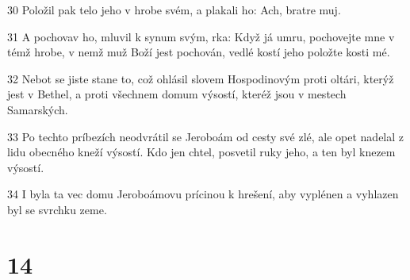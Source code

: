 \par 30 Položil pak telo jeho v hrobe svém, a plakali ho: Ach, bratre muj.
\par 31 A pochovav ho, mluvil k synum svým, rka: Když já umru, pochovejte mne v témž hrobe, v nemž muž Boží jest pochován, vedlé kostí jeho položte kosti mé.
\par 32 Nebot se jiste stane to, což ohlásil slovem Hospodinovým proti oltári, kterýž jest v Bethel, a proti všechnem domum výsostí, kteréž jsou v mestech Samarských.
\par 33 Po techto príbezích neodvrátil se Jeroboám od cesty své zlé, ale opet nadelal z lidu obecného kneží výsostí. Kdo jen chtel, posvetil ruky jeho, a ten byl knezem výsostí.
\par 34 I byla ta vec domu Jeroboámovu prícinou k hrešení, aby vyplénen a vyhlazen byl se svrchku zeme.

\chapter{14}

